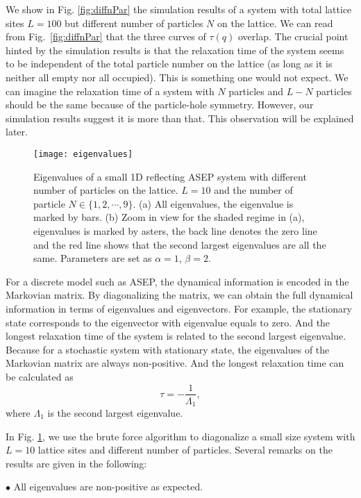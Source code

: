 We show in Fig. \ref{fig:diffnPar} the simulation results of a system with total lattice sites $L=100$ but different number of particles $N$ on the lattice. We can read from Fig.~\ref{fig:diffnPar} that the three curves of $\tau(q)$ overlap. The crucial point hinted by the simulation results is that the relaxation time of the system seems to be independent of the total particle number on the lattice (as long as it is neither all empty nor all occupied). This is something one would not expect. We can imagine the relaxation time of a system with $N$ particles and $L-N$ particles should be the same because of the particle-hole symmetry. However, our simulation results suggest it is more than that. This observation will be explained later.

\begin{figure}[htpb]
    \centering
    \texttt{[image: eigenvalues]}
    \caption{Eigenvalues of a small 1D reflecting ASEP system with different number of particles on the lattice. $L=10$ and the number of particle $N\in\{1,2,\cdots,9\}$. (a) All eigenvalues, the eigenvalue is marked by bars. (b) Zoom in view for the shaded regime in (a), eigenvalues is marked by asters, the back line denotes the zero line and the red line shows that the second largest eigenvalues are all the same. Parameters are set as $\alpha=1$, $\beta=2$.}
    \label{fig:eigenvalues}
\end{figure}
For a discrete model such as ASEP, the dynamical information is encoded in the Markovian matrix. By diagonalizing the matrix, we can obtain the full dynamical information in terms of eigenvalues and eigenvectors. For example, the stationary state corresponds to the eigenvector with eigenvalue equals to zero. And the longest relaxation time of the system is related to the second largest eigenvalue. Because for a stochastic system with stationary state, the eigenvalues of the Markovian matrix are always non-positive. And the longest relaxation time can be calculated as 
\begin{equation}
    \label{eq:eigenvalue2relaxation}
    \tau = - \frac{1}{\Lambda_1},
\end{equation}
where $\Lambda_1$ is the second largest eigenvalue.

In Fig. \ref{fig:eigenvalues}, we use the brute force algorithm to diagonalize a small size system with $L=10$ lattice sites and different number of particles. Several remarks on the results are given in the following:

$\bullet$ All eigenvalues are non-positive as expected. 


